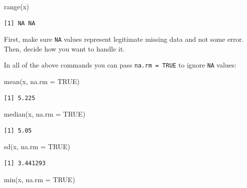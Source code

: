 \documentclass[
]{book}
\newenvironment{Shaded}{\begin{snugshade}}{\end{snugshade}}
\newcommand{\AttributeTok}[1]{\textcolor[rgb]{0.77,0.63,0.00}{#1}}
\newcommand{\ConstantTok}[1]{\textcolor[rgb]{0.00,0.00,0.00}{#1}}
\newcommand{\FunctionTok}[1]{\textcolor[rgb]{0.00,0.00,0.00}{#1}}
\newcommand{\NormalTok}[1]{#1}
\begin{document}
\begin{Shaded}
\begin{Highlighting}[]
\FunctionTok{range}\NormalTok{(x)}
\end{Highlighting}
\end{Shaded}

\begin{verbatim}
[1] NA NA
\end{verbatim}

First, make sure \texttt{NA} values represent legitimate missing data and not some error.\\
Then, decide how you want to handle it.

In all of the above commands you can pass \texttt{na.rm\ =\ TRUE} to ignore \texttt{NA} values:

\begin{Shaded}
\begin{Highlighting}[]
\FunctionTok{mean}\NormalTok{(x, }\AttributeTok{na.rm =} \ConstantTok{TRUE}\NormalTok{)}
\end{Highlighting}
\end{Shaded}

\begin{verbatim}
[1] 5.225
\end{verbatim}

\begin{Shaded}
\begin{Highlighting}[]
\FunctionTok{median}\NormalTok{(x, }\AttributeTok{na.rm =} \ConstantTok{TRUE}\NormalTok{)}
\end{Highlighting}
\end{Shaded}

\begin{verbatim}
[1] 5.05
\end{verbatim}

\begin{Shaded}
\begin{Highlighting}[]
\FunctionTok{sd}\NormalTok{(x, }\AttributeTok{na.rm =} \ConstantTok{TRUE}\NormalTok{)}
\end{Highlighting}
\end{Shaded}

\begin{verbatim}
[1] 3.441293
\end{verbatim}

\begin{Shaded}
\begin{Highlighting}[]
\FunctionTok{min}\NormalTok{(x, }\AttributeTok{na.rm =} \ConstantTok{TRUE}\NormalTok{)}
\end{Highlighting}
\end{Shaded}
\end{document}
